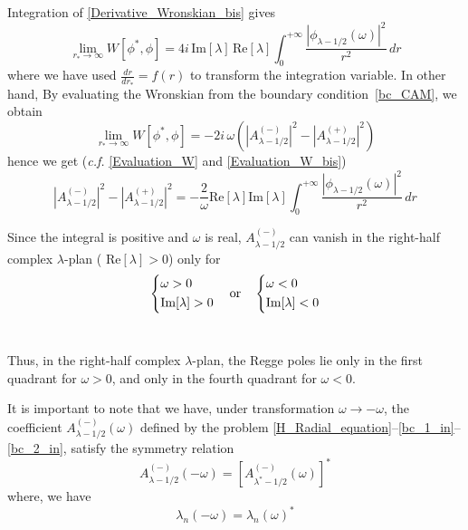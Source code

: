 \documentclass[aps,prd,longbibliography,reprint,twocolumn,amsmath,amssymb,amsfonts,showpacs,footnote,superscriptaddress]{revtex4-1}%
\begin{document}
Integration of \eqref{Derivative_Wronskian_bis} gives
\begin{equation}\label{Evaluation_W}
\lim_{r_*\rightarrow \infty}  W[\phi^*,\phi] = 4i\, \text{Im}[\lambda]\, \text{Re}[\lambda] \int_{0}^{+\infty} \frac{|\phi_{\lambda-1/2}(\omega)|^2}{r^2}\,dr
\end{equation}
where we have used $\frac{dr}{dr_*}=f(r)$ to transform the integration variable. In other hand,  By evaluating the  Wronskian from the boundary condition~\eqref{bc_CAM}, we obtain
\begin{equation}\label{Evaluation_W_bis}
\lim_{r_*\rightarrow \infty}  W[\phi^*,\phi] =-2i\, \omega\left(|A^{(-)}_{\lambda-1/2}|^2-|A^{(+)}_{\lambda-1/2}|^2\right)
\end{equation}
hence we get (\textit{c.f.} \eqref{Evaluation_W} and  \eqref{Evaluation_W_bis})
\begin{equation}\label{Evaluation_W_bis_1}
  |A^{(-)}_{\lambda-1/2}|^2-|A^{(+)}_{\lambda-1/2}|^2 = -\frac{2}{\omega}\text{Re}[\lambda]\text{Im}[\lambda]\int_{0}^{+\infty} \frac{ |\phi_{\lambda-1/2}(\omega)|^2}{r^2}\,dr
\end{equation}

Since the integral is positive and $\omega$ is real, $A^{(-)}_{\lambda-1/2}$ can  vanish in the right-half complex $\lambda$-plan ( $\text{Re}[\lambda] >0 $) only for
\begin{equation}
    \begin{dcases}
        \omega>0 \\
        \text{Im}[\lambda]>0
     \end{dcases}
\quad\text{or}\quad
    \begin{dcases}
      \omega<0 \\
        \text{Im}[\lambda]<0
    \end{dcases}
\end{equation}\

Thus, in the right-half complex $\lambda$-plan, the Regge poles lie only in the first quadrant for $\omega > 0$, and only in the fourth quadrant for $\omega < 0$.

It is important to note that we have, under transformation $\omega \rightarrow -\omega$, the coefficient $A^{(-)}_{\lambda-1/2}(\omega)$ defined by the problem  \eqref{H_Radial_equation}--\eqref{bc_1_in}--\eqref{bc_2_in}, satisfy the symmetry relation
\begin{equation}\label{symmetry_relation}
 A^{(-)}_{\lambda-1/2}(-\omega) = \left[A^{(-)}_{\lambda^*-1/2}(\omega)\right]^*
\end{equation}
where, we have
\begin{equation}\label{Relation_1st_4th}
\lambda_n(-\omega) = \lambda_n(\omega)^*
\end{equation}
\end{document}
